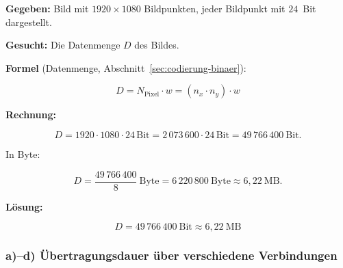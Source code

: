\begin{beispiel}

\textbf{Gegeben:} Bild mit $1920 \times 1080$ Bildpunkten, jeder Bildpunkt mit
$24$~Bit dargestellt.

\textbf{Gesucht:} Die Datenmenge $D$ des Bildes.

\textbf{Formel} (Datenmenge, Abschnitt~\ref{sec:codierung-binaer}):

$$
D = N_{\text{Pixel}} \cdot w = (n_x \cdot n_y) \cdot w
$$

\textbf{Rechnung:}

$$
D = 1920 \cdot 1080 \cdot 24\,\text{Bit}
  = 2\,073\,600 \cdot 24\,\text{Bit}
  = 49\,766\,400\ \text{Bit}.
$$

In Byte:

$$
D = \frac{49\,766\,400}{8}\ \text{Byte} = 6\,220\,800\ \text{Byte}
  \approx 6{,}22\ \text{MB}.
$$

\textbf{Lösung:}

$$
\boxed{\;D = 49\,766\,400\ \text{Bit} \approx 6{,}22\ \text{MB}\;}
$$

\end{beispiel}

\subsubsection*{a)–d) Übertragungsdauer über verschiedene Verbindungen}

